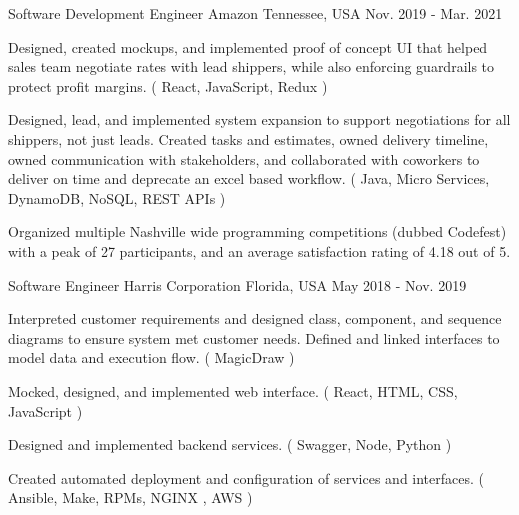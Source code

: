 \begin{cventries}
  \cventry
    {Software Development Engineer} %
    {Amazon} %
    {Tennessee, USA} %
    {Nov. 2019 - Mar. 2021} %
    {
      \begin{cvitems} %
        \item {Designed, created mockups, and implemented proof of concept UI that helped sales team negotiate rates with lead shippers, while also enforcing guardrails to protect profit margins. ( React, JavaScript, Redux )}
        \item {Designed, lead, and implemented system expansion to support negotiations for all shippers, not just leads. Created tasks and estimates, owned delivery timeline, owned communication with stakeholders, and collaborated with coworkers to deliver on time and deprecate an excel based workflow. ( Java, Micro Services, DynamoDB, NoSQL, REST APIs )}
        \item {Organized multiple Nashville wide programming competitions (dubbed Codefest) with a peak of 27 participants, and an average satisfaction rating of 4.18 out of 5.}
      \end{cvitems}
    }

  \cventry
    {Software Engineer} %
    {Harris Corporation} %
    {Florida, USA} %
    {May 2018 - Nov. 2019} %
    {
      \begin{cvitems} %
        \item {Interpreted customer requirements and designed class, component, and sequence diagrams to ensure system met customer needs. Defined and linked interfaces to model data and execution flow. ( MagicDraw )}
        \item {Mocked, designed, and implemented web interface. ( React, HTML, CSS, JavaScript )}
        \item {Designed and implemented backend services. ( Swagger, Node, Python )}
        \item {Created automated deployment and configuration of services and interfaces. ( Ansible, Make, RPMs, NGINX , AWS )}
      \end{cvitems}
    }

\end{cventries}
